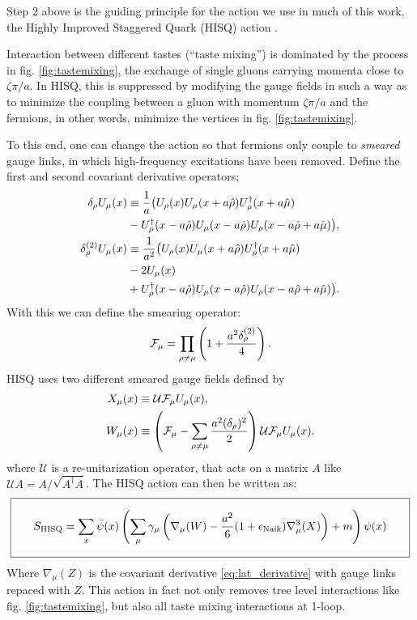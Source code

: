     Step 2 above is the guiding principle for the action we use in much of this work, the Highly Improved Staggered Quark (HISQ) action \cite{Follana:2006rc}.

    Interaction between different tastes (``taste mixing'') is dominated by the process in fig. \ref{fig:tastemixing}, the exchange of single gluons carrying momenta close to $\zeta \pi/a$. In HISQ, this is suppressed by modifying the gauge fields in such a way as to minimize the coupling between a gluon with momentum ${\zeta\pi/a}$ and the fermions, in other words, minimize the vertices in fig. \ref{fig:tastemixing}.

    To this end, one can change the action so that fermions only couple to {\textit{smeared}} gauge links, in which high-frequency excitations have been removed. Define the first and second covariant derivative operators;
    \begin{align}
      \nonumber
      \delta_{\rho}U_{\mu}(x) & \equiv {1\over a} \big( U_{\rho} (x) U_{\mu} (x + a\hat{\rho}) U_{\rho}^{\dagger}(x+a\hat{\mu}) \\
      & - U_{\rho}^{\dagger}(x-a\hat{\rho})U_{\mu}(x-a\hat{\rho})U_{\rho}(x-a\hat{\rho}+a\hat{\mu})\big),  \\
      \nonumber
      \delta_{\rho}^{(2)} U_{\mu}(x) & \equiv {1\over a^2} \big( U_{\rho}(x) U_{\mu}(x+a\hat{\rho})U^{\dagger}_{\rho}(x+a\hat{\mu}) \\
      \nonumber
      & - 2U_{\mu}(x) \\
      & + U_{\rho}^{\dagger}(x-a\hat{\rho})U_{\mu}(x-a\hat{\rho})U_{\rho}(x - a\hat{\rho} + a\hat{\mu}) \big).
    \end{align}
    With this we can define the smearing operator:
    \begin{align}
      \mathcal{F}_{\mu} = \prod_{\rho\neq\mu} \left( 1 + {a^2 \delta^{(2)}_{\rho}\over 4} \right).
    \end{align}
    HISQ uses two different smeared gauge fields defined by
    \begin{align}
      X_{\mu}(x) &\equiv \mathcal{U} \mathcal{F}_{\mu} U_{\mu}(x), \\
      W_{\mu}(x) &\equiv \left(\mathcal{F}_{\mu} - \sum_{\rho\neq\mu}{a^2(\delta_{\rho})^2\over 2} \right) \mathcal{U} \mathcal{F}_{\mu} U_{\mu}(x).
      \label{eq:gaugesmearing}
    \end{align}
    where $\mathcal{U}$ is a re-unitarization operator, that acts on a matrix $A$ like $\mathcal{U}A = A/\sqrt{A^{\dagger}A}$. The HISQ action can then be written as:
    \begin{align}
{\setlength\fboxsep{10pt} \boxed{\quad      S_{\text{HISQ}} = \sum_{x} \bar{\psi}(x) \left( \sum_{\mu} \gamma_{\mu} \left( \nabla_{\mu}(W) - {a^2\over 6}(1+\epsilon_{\text{Naik}})\nabla^3_{\mu}(X) \right) + m \right) \psi(x) \quad}}
    \end{align}
    Where $\nabla_{\mu}(Z)$ is the covariant derivative \eqref{eq:lat_derivative} with gauge links repaced with $Z$. This action in fact not only removes tree level interactions like fig. \ref{fig:tastemixing}, but also all taste mixing interactions at 1-loop.

